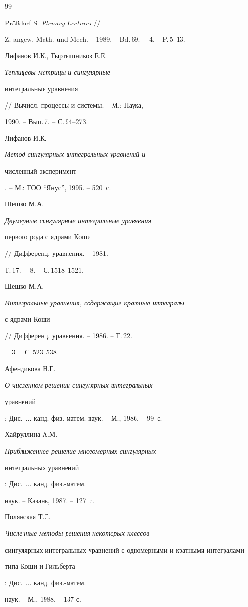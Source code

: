 \begin{thebibliography}{99}


Pr\"{o}\ss{}dorf S. {\em Plenary Lectures} //


Z. angew. Math. und Mech. -- 1989. -- Bd.\,69. -- \No\,4. -- P.\,5--13.




Лифанов И.К., Тыртышников Е.Е. {\em Теплицевы матрицы и сингулярные 


интегральные уравнения} // Вычисл. процессы и системы. -- М.: Наука,


1990. -- Вып.\,7. -- С.\,94--273.




Лифанов И.К. {\em Метод сингулярных интегральных уравнений и 


численный эксперимент}. -- М.: ТОО ``Янус'', 1995. -- 520~с.




Шешко М.А. {\em Двумерные сингулярные интегральные уравнения 


первого рода с ядрами Коши} // Дифференц. уравнения. -- 1981. --


Т.\,17. -- \No\,8. -- С.\,1518--1521.




Шешко М.А. {\em Интегральные уравнения, содержащие кратные интегралы 


с ядрами Коши} // Дифференц. уравнения. -- 1986. -- Т.\,22.


-- \No\,3. -- С.\,523--538.




Афендикова Н.Г. {\em О численном решении сингулярных интегральных 


уравнений}: Дис.~$\dotsc$ канд. физ.-матем. наук. -- М., 1986. -- 99~с.




Хайруллина А.М. {\em Приближенное решение многомерных сингулярных 


интегральных уравнений}: Дис.~$\dotsc$ канд. физ.-матем.


наук. -- Казань, 1987. -- 127~с.




Полянская Т.С. {\em Численные методы решения некоторых классов 


сингулярных интегральных уравнений с одномерными и кратными интегралами 


типа Коши и Гильберта}: Дис.~$\dotsc$ канд. физ.-матем.


наук. -- М., 1988. -- 137 с.



\end{thebibliography}
